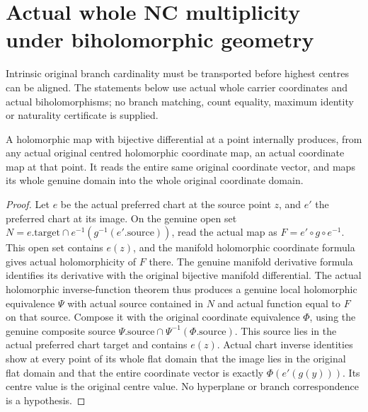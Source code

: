 \section{Actual whole NC multiplicity under biholomorphic geometry}
\label{sec:hironaka-normal-crossings-biholomorphic-multiplicity}

Intrinsic original branch cardinality must be transported before highest
centres can be aligned. The statements below use actual whole carrier
coordinates and actual biholomorphisms; no branch matching, count equality,
maximum identity or naturality certificate is supplied.

\begin{lemma}
\label{hir:general-nc-actual-local-biholomorphic-coordinate-reader}
\leanok
{}
A holomorphic map with bijective differential at a point internally
produces, from any actual original centred holomorphic coordinate map,
an actual coordinate map at that point. It reads the entire same
original coordinate vector, and maps its whole genuine domain into the
whole original coordinate domain.
\end{lemma}
\begin{proof}
Let $e$ be the actual preferred chart at the source point $z$, and $e'$
the preferred chart at its image. On the genuine open set
$N=e.\mathrm{target}\cap e^{-1}(g^{-1}(e'.\mathrm{source}))$,
read the actual map as $F=e'\circ g\circ e^{-1}$. This open set contains
$e(z)$, and the manifold holomorphic coordinate formula gives actual
holomorphicity of $F$ there. The genuine manifold derivative formula
identifies its derivative with the original bijective manifold
differential. The actual holomorphic inverse-function theorem thus
produces a genuine local holomorphic equivalence $\Psi$ with actual
source contained in $N$ and actual function equal to $F$ on that
source. Compose it with the original coordinate equivalence $\Phi$,
using the genuine composite source $\Psi.\mathrm{source}\cap
\Psi^{-1}(\Phi.\mathrm{source})$. This source lies in the actual
preferred chart target and contains $e(z)$. Actual chart inverse
identities show at every point of its whole flat domain that the
image lies in the original flat domain and that the entire coordinate
vector is exactly $\Phi(e'(g(y)))$. Its centre value is the original
centre value. No hyperplane or branch correspondence is a hypothesis.
\end{proof}

